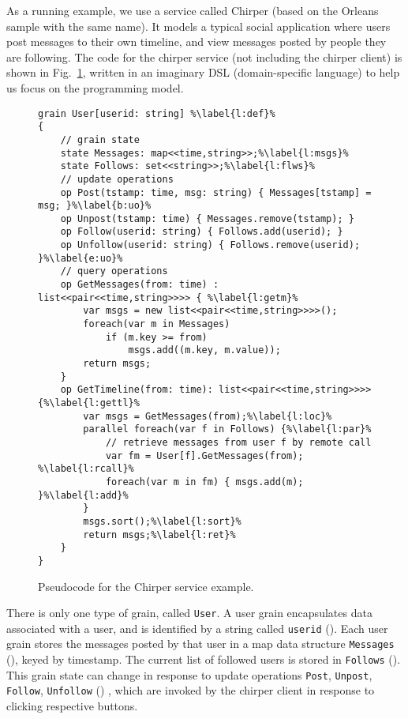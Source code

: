 As a running example, we use a service called Chirper (based on the Orleans sample with the same name). It models a typical social application where users post messages to their own timeline, and view messages posted by people they are following.
The code for the chirper service (not including the chirper client) is shown in Fig.~\ref{fig:chirper}, written in an imaginary DSL (domain-specific language) to help us focus on the programming model. 

\begin{figure}
\begin{lstlisting}
grain User[userid: string] %\label{l:def}%
{
	// grain state
	state Messages: map<<time,string>>;%\label{l:msgs}%
	state Follows: set<<string>>;%\label{l:flws}%
	// update operations
	op Post(tstamp: time, msg: string) { Messages[tstamp] = msg; }%\label{b:uo}%
	op Unpost(tstamp: time) { Messages.remove(tstamp); }
	op Follow(userid: string) { Follows.add(userid); }
	op Unfollow(userid: string) { Follows.remove(userid); }%\label{e:uo}%
	// query operations
	op GetMessages(from: time) : list<<pair<<time,string>>>> { %\label{l:getm}%
		var msgs = new list<<pair<<time,string>>>>();
		foreach(var m in Messages)
			if (m.key >= from)
				msgs.add((m.key, m.value));
		return msgs;
	}
	op GetTimeline(from: time): list<<pair<<time,string>>>> {%\label{l:gettl}%
		var msgs = GetMessages(from);%\label{l:loc}%
		parallel foreach(var f in Follows) {%\label{l:par}%
			// retrieve messages from user f by remote call
			var fm = User[f].GetMessages(from); %\label{l:rcall}%
			foreach(var m in fm) { msgs.add(m); }%\label{l:add}%
		}
		msgs.sort();%\label{l:sort}%
		return msgs;%\label{l:ret}%
	}
}
\end{lstlisting}
\caption{Pseudocode for the Chirper service example.}\label{fig:chirper}
\end{figure}

There is only one type of grain, called \lstinline|User|.  A user grain encapsulates data associated with a user, and is identified by a string called \lstinline{userid} (). Each user grain stores the messages posted by that user in a map data structure \lstinline|Messages| (), keyed by timestamp. The current list of followed users is stored in \lstinline|Follows| (). This grain state can change in response to update operations \lstinline|Post|, \lstinline|Unpost|, \lstinline|Follow|, \lstinline|Unfollow| () , which are invoked by the chirper client in response to clicking respective buttons.

